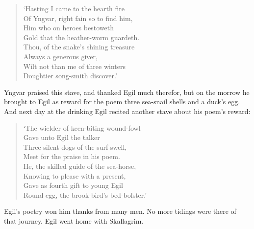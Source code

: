 \begin{verse}
`Hasting I came to the hearth fire \\
Of Yngvar, right fain so to find him, \\
Him who on heroes bestoweth \\
Gold that the heather-worm guardeth. \\
Thou, of the snake's shining treasure \\
Always a generous giver, \\
Wilt not than me of three winters \\
Doughtier song-smith discover.' \\
\end{verse}


Yngvar praised this stave, and thanked Egil much therefor, but on the morrow he brought to Egil as reward for the poem three sea-snail shells and a duck's egg. And next day at the drinking Egil recited another stave about his poem's reward:

\begin{verse}
`The wielder of keen-biting wound-fowl \\
Gave unto Egil the talker \\
Three silent dogs of the surf-swell, \\
Meet for the praise in his poem. \\
He, the skilled guide of the sea-horse, \\
Knowing to please with a present, \\
Gave as fourth gift to young Egil \\
Round egg, the brook-bird's bed-bolster.' \\
\end{verse}

Egil's poetry won him thanks from many men. No more tidings were there of that journey. Egil went home with Skallagrim.
